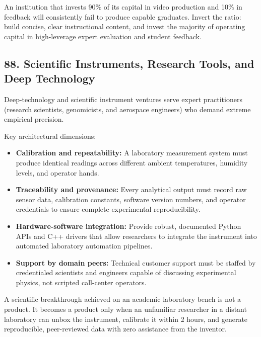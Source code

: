 An institution that invests 90\% of its capital in video production and 10\% in feedback will consistently fail to produce capable graduates. Invert the ratio: build concise, clear instructional content, and invest the majority of operating capital in high-leverage expert evaluation and student feedback.

\subsection*{88. Scientific Instruments, Research Tools, and Deep Technology}

Deep-technology and scientific instrument ventures serve expert practitioners (research scientists, genomicists, and aerospace engineers) who demand extreme empirical precision.

Key architectural dimensions:
\begin{itemize}
    \item \textbf{Calibration and repeatability:} A laboratory measurement system must produce identical readings across different ambient temperatures, humidity levels, and operator hands.
    \item \textbf{Traceability and provenance:} Every analytical output must record raw sensor data, calibration constants, software version numbers, and operator credentials to ensure complete experimental reproducibility.
    \item \textbf{Hardware-software integration:} Provide robust, documented Python APIs and C++ drivers that allow researchers to integrate the instrument into automated laboratory automation pipelines.
    \item \textbf{Support by domain peers:} Technical customer support must be staffed by credentialed scientists and engineers capable of discussing experimental physics, not scripted call-center operators.
\end{itemize}

A scientific breakthrough achieved on an academic laboratory bench is not a product. It becomes a product only when an unfamiliar researcher in a distant laboratory can unbox the instrument, calibrate it within 2 hours, and generate reproducible, peer-reviewed data with zero assistance from the inventor.
